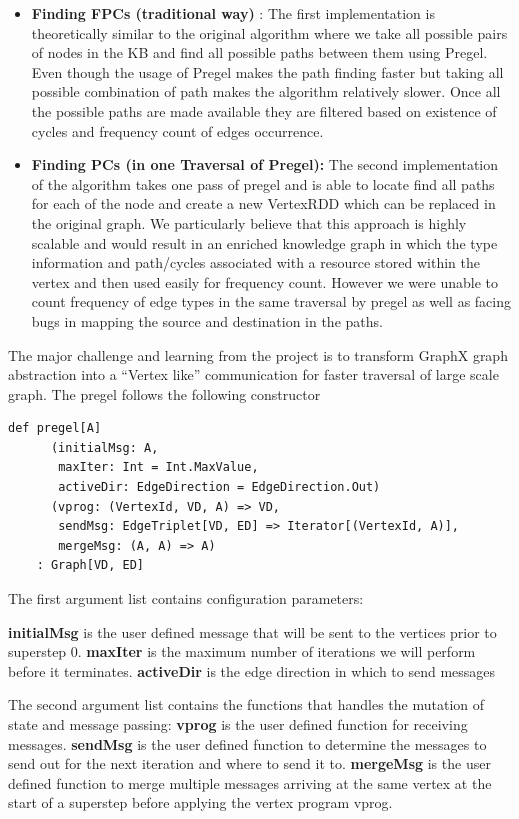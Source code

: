 \documentclass{easychair}
\begin{document}
\begin{itemize}
\item \textbf{Finding FPCs (traditional way)} : The first implementation is theoretically similar to the  original algorithm where we take all possible pairs of nodes in the KB and find all possible paths between them using Pregel. Even though the usage of Pregel makes the path finding faster but taking all possible combination of path makes the algorithm relatively slower. Once all the possible paths are made available they are filtered based on existence of cycles and frequency count of edges occurrence.
\item \textbf{Finding PCs (in one Traversal of Pregel):} The second implementation of the algorithm takes one pass of pregel and is able to locate find all paths for each of the node and create a new VertexRDD which can be replaced in the original graph. We particularly believe that this approach is highly scalable and would result in an enriched knowledge graph in which the type information and path/cycles associated with a resource stored within the vertex and then used easily for frequency count.  However we were unable to count frequency of edge types in the same traversal by pregel as well as facing bugs in mapping the source and destination in the paths. 

\end{itemize}

The major challenge and learning from the project is to transform GraphX graph abstraction into a “Vertex like” communication for faster traversal of large scale graph. The pregel follows the following constructor

\begin{lstlisting}
def pregel[A]
      (initialMsg: A,
       maxIter: Int = Int.MaxValue,
       activeDir: EdgeDirection = EdgeDirection.Out)
      (vprog: (VertexId, VD, A) => VD,
       sendMsg: EdgeTriplet[VD, ED] => Iterator[(VertexId, A)],
       mergeMsg: (A, A) => A)
    : Graph[VD, ED]
\end{lstlisting}

The first argument list contains configuration parameters:

\textbf{initialMsg} is the user defined message that will be sent to the vertices prior to superstep 0. \textbf{maxIter} is the maximum number of iterations we will perform before it terminates. \textbf{activeDir} is the  edge direction in which to send messages

The second argument list contains the functions that handles the mutation of state and message passing: \textbf{vprog} is the user defined function for receiving messages.  \textbf{sendMsg} is the user defined function to determine the messages to send out for the next iteration and where to send it to.  \textbf{mergeMsg} is the user defined function to merge multiple messages arriving at the same vertex at the start of a superstep before applying the vertex program vprog.
\end{document}
